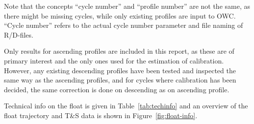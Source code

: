 \documentclass{article}
\begin{document}
Note that the concepts ``cycle number'' and ``profile number'' are
not the same, as there might be missing cycles, while only existing
profiles are input to OWC. ``Cycle number'' refers to the actual cycle
number parameter and file naming of R/D-files.

Only results for ascending profiles are included in this report, as these
are of primary interest and the only ones used for the estimation of
calibration. However, any existing descending profiles have been tested
and inspected the same way as the ascending profiles, and for cycles where
calibration has been decided, the same correction is done on descending as
on ascending profile.

Technical info on the float is given in Table~\ref{tab:techinfo} and an
overview of the float trajectory and T\&S data is shown in
Figure~\ref{fig:float-info}.
%
\end{document}
